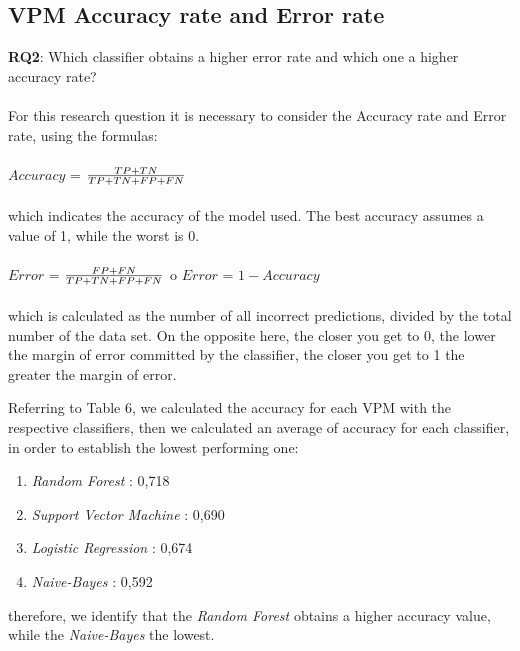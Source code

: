 \documentclass[twocolumn,10pt]{asme2ej}
\begin{document}
\subsection{VPM Accuracy rate and Error rate}
\textbf{RQ2}: Which classifier obtains a higher error rate and which one a higher accuracy rate?\\
\\For this research question it is necessary to consider the Accuracy rate and Error rate, using the formulas:\\
\\${Accuracy }$ = {\Large ${ TP + TN \over TP + TN + FP + FN}$}\\
\\which indicates the accuracy of the model used. The best accuracy assumes a value of 1, while the worst is 0.\\
\\${Error }$ = {\Large ${ FP + FN \over TP + TN + FP + FN}$} o ${Error}$ = ${1 - Accuracy}$ $ $\\
\\which is calculated as the number of all incorrect predictions, divided by the total number of the data set. On the opposite here, the closer you get to 0, the lower the margin of error committed by the classifier, the closer you get to 1 the greater the margin of error.

Referring to Table 6, we calculated the accuracy for each VPM with the respective classifiers, then we calculated an average of accuracy for each classifier, in order to establish the lowest performing one:
\begin{enumerate}
    \item \textit{Random Forest} : 0,718
    \item \textit{Support Vector Machine} : 0,690
    \item \textit{Logistic Regression} : 0,674
    \item \textit{Naive-Bayes} : 0,592
\end{enumerate}
therefore, we identify that the \textit{Random Forest} obtains a higher accuracy value, while the \textit{Naive-Bayes} the lowest.
\end{document}
